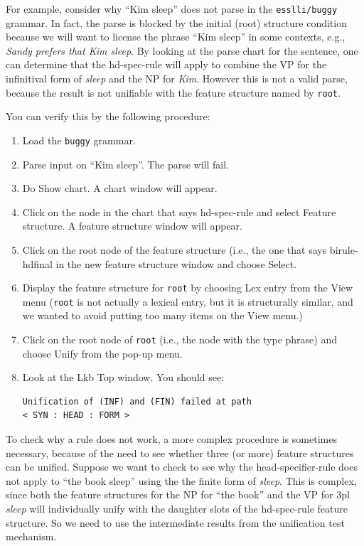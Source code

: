 \documentclass[12pt]{report}
\newcommand{\filename}[1]{{\tt #1}}
\newcommand{\lkbmenucommand}{{\bf}}
\begin{document}
For example, consider why ``Kim sleep'' does not parse in the 
\filename{esslli/buggy}
grammar.  
In fact, the parse is blocked by the initial (root) structure condition
because we will want to license the
phrase ``Kim sleep'' in some contexts, e.g., 
{\it Sandy prefers that Kim sleep}.
By looking at the 
parse chart for the sentence, one can determine that
the hd-spec-rule will apply to combine the VP for
the infinitival form of {\it sleep} and the NP for {\it Kim}.
However this is not a valid parse, because the result is not unifiable with the
feature structure named by {\tt root}.

You can verify this by the following procedure:
\begin{enumerate}
\item Load the \filename{buggy} grammar.
\item {\lkbmenucommand Parse input} on ``Kim sleep''.  The parse will fail.
\item Do {\lkbmenucommand Show chart}.  A chart window will appear.
\item Click on the node in the chart that says hd-spec-rule and 
select {\lkbmenucommand Feature structure}. A feature structure window will
appear.
\item 
Click on the root node of the feature structure (i.e., the one
that says {\type birule-hdfinal} in the 
new feature structure
window and 
choose {\lkbmenucommand Select}.
\item Display the feature structure for {\tt root} by choosing
{\lkbmenucommand Lex entry} from the {\lkbmenucommand View} menu ({\tt root} is not actually a
lexical entry, but it is structurally similar, and we wanted to avoid putting
too many items on the {\lkbmenucommand View} menu.)
\item Click on the root node of {\tt root} (i.e., the node
with the type {\type phrase}) and choose {\lkbmenucommand Unify} from the pop-up menu.
\item Look at the Lkb Top window.  You should see:
\begin{verbatim}
Unification of (INF) and (FIN) failed at path 
< SYN : HEAD : FORM >
\end{verbatim}
\end{enumerate}

To check why a rule does not work, a more complex
procedure is sometimes necessary, because of the need to see whether
three (or more) feature structures can be unified.  
Suppose we want to check to see why the head-specifier-rule
does not apply to ``the book sleep'' using the
the finite form of {\it sleep}. This is 
complex, since both the feature structures for the NP for ``the book'' and
the VP for 3pl {\it sleep} will individually unify with the
daughter slots of the hd-spec-rule feature structure.
So we need to use the intermediate results 
from the unification test mechanism.
\end{document}

